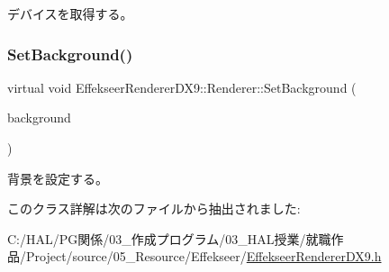 デバイスを取得する。 

\mbox{\label{class_effekseer_renderer_d_x9_1_1_renderer_a4ba4636b187f74288fdd6ff68071196d}} 
\subsubsection{\texorpdfstring{Set\+Background()}{SetBackground()}}
{\footnotesize\ttfamily virtual void Effekseer\+Renderer\+D\+X9\+::\+Renderer\+::\+Set\+Background (\begin{DoxyParamCaption}\item[{I\+Direct3\+D\+Texture9 $\ast$}]{background }\end{DoxyParamCaption})\hspace{0.3cm}{\ttfamily [pure virtual]}}



背景を設定する。 



このクラス詳解は次のファイルから抽出されました\+:\begin{DoxyCompactItemize}
\item 
C\+:/\+H\+A\+L/\+P\+G関係/03\+\_\+作成プログラム/03\+\_\+\+H\+A\+L授業/就職作品/\+Project/source/05\+\_\+\+Resource/\+Effekseer/\mbox{\hyperlink{_effekseer_renderer_d_x9_8h}{Effekseer\+Renderer\+D\+X9.\+h}}\end{DoxyCompactItemize}
